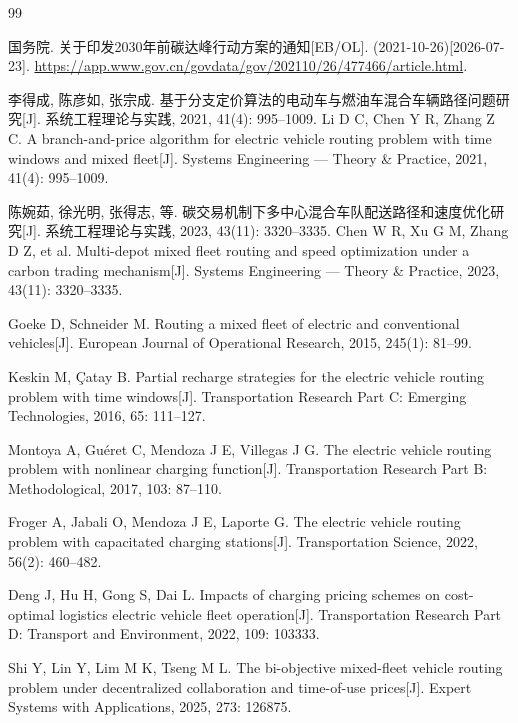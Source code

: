 \documentclass{setp-new}
\begin{document}
\begin{thebibliography}{99}

 国务院. 关于印发2030年前碳达峰行动方案的通知[EB/OL]. (2021-10-26)[2026-07-23].
\url{https://app.www.gov.cn/govdata/gov/202110/26/477466/article.html}.


 李得成, 陈彦如, 张宗成. 基于分支定价算法的电动车与燃油车混合车辆路径问题研究[J]. 系统工程理论与实践, 2021, 41(4): 995--1009.\newline
Li D C, Chen Y R, Zhang Z C. A branch-and-price algorithm for electric vehicle routing problem with time windows and mixed fleet[J]. Systems Engineering --- Theory \& Practice, 2021, 41(4): 995--1009.


 陈婉茹, 徐光明, 张得志, 等. 碳交易机制下多中心混合车队配送路径和速度优化研究[J]. 系统工程理论与实践, 2023, 43(11): 3320--3335.\newline
Chen W R, Xu G M, Zhang D Z, et al. Multi-depot mixed fleet routing and speed optimization under a carbon trading mechanism[J]. Systems Engineering --- Theory \& Practice, 2023, 43(11): 3320--3335.


 Goeke D, Schneider M. Routing a mixed fleet of electric and conventional vehicles[J]. European Journal of Operational Research, 2015, 245(1): 81--99.


 Keskin M, \c{C}atay B. Partial recharge strategies for the electric vehicle routing problem with time windows[J]. Transportation Research Part C: Emerging Technologies, 2016, 65: 111--127.


 Montoya A, Guéret C, Mendoza J E, Villegas J G. The electric vehicle routing problem with nonlinear charging function[J]. Transportation Research Part B: Methodological, 2017, 103: 87--110.

 Froger A, Jabali O, Mendoza J E, Laporte G. The electric vehicle routing problem with capacitated charging stations[J]. Transportation Science, 2022, 56(2): 460--482.


 Deng J, Hu H, Gong S, Dai L. Impacts of charging pricing schemes on cost-optimal logistics electric vehicle fleet operation[J]. Transportation Research Part D: Transport and Environment, 2022, 109: 103333.

 Shi Y, Lin Y, Lim M K, Tseng M L. The bi-objective mixed-fleet vehicle routing problem under decentralized collaboration and time-of-use prices[J]. Expert Systems with Applications, 2025, 273: 126875.



\end{thebibliography}
\end{document}
